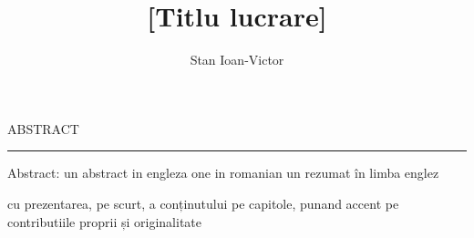 \documentclass[12pt]{report}
\begin{document}
\theoremstyle{definition}
\newtheorem{theorem}{}
\newtheorem{corollary}[theorem]{Corollary}
\theoremstyle{definition}
\newtheorem{definition}{Definition}
\newtheorem{lemma}{Lemma}
\newtheorem{proposition}{Proposition}

\title{[Titlu lucrare]}
\author{Stan Ioan-Victor}

\maketitle

\newpage
\thispagestyle{empty}
\mbox{}
\newpage
{}

\cleardoublepage
ABSTRACT
\vspace{0.5cm}
\hrule
\vspace{0.5cm}

Abstract:
un abstract in engleza
one in romanian
un rezumat în limba englez

cu prezentarea, pe scurt, a conținutului pe capitole, punand accent pe contributiile proprii și originalitate

\tableofcontents

\newpage
{}









\printbibliography
\end{document}
